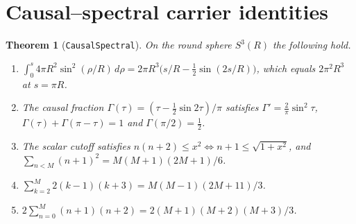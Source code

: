 \documentclass[11pt]{article}
\newtheorem{theorem}{Theorem}[section]
\theoremstyle{remark}
\newcommand{\lean}[1]{\texttt{#1}}
\begin{document}
\section{Causal--spectral carrier identities}
\begin{theorem}[\lean{CausalSpectral}]
On the round sphere $S^3(R)$ the following hold.
\begin{enumerate}
\item $\int_0^s4\pi R^2\sin^2(\rho/R)\,d\rho=2\pi R^3\bigl(s/R-\tfrac12\sin(2s/R)\bigr)$,
which equals $2\pi^2R^3$ at $s=\pi R$.
\item The causal fraction $\Gamma(\tau)=(\tau-\tfrac12\sin2\tau)/\pi$ satisfies
$\Gamma'=\tfrac2\pi\sin^2\tau$, $\Gamma(\tau)+\Gamma(\pi-\tau)=1$ and $\Gamma(\pi/2)=\tfrac12$.
\item The scalar cutoff satisfies $n(n+2)\le x^2\iff n+1\le\sqrt{1+x^2}$, and
$\sum_{n<M}(n+1)^2=M(M+1)(2M+1)/6$.
\item $\sum_{k=2}^M2(k-1)(k+3)=M(M-1)(2M+11)/3$.
\item $2\sum_{n=0}^M(n+1)(n+2)=2(M+1)(M+2)(M+3)/3$.
\end{enumerate}
\end{theorem}
\end{document}
